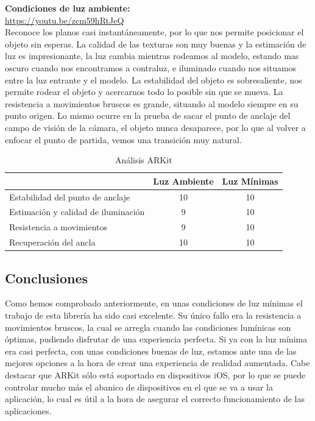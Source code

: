 \textbf{Condiciones de luz ambiente:}\\
\url{https://youtu.be/zcm59hRtJeQ}\\

Reconoce los planos casi instantáneamente, por lo que nos permite posicionar el objeto sin esperas. La calidad de las texturas son muy buenas y la estimación de luz es impresionante, la luz cambia mientras rodeamos al modelo, estando mas oscuro cuando nos encontramos a contraluz, e iluminado cuando nos situamos entre la luz entrante y el modelo. La estabilidad del objeto es sobresaliente, nos permite rodear el objeto y acercarnos todo lo posible sin que se mueva. La resistencia a movimientos bruscos es grande, situando al modelo siempre en su punto origen. Lo mismo ocurre en la prueba de sacar el punto de anclaje del campo de visión de la cámara, el objeto nunca desaparece, por lo que al volver a enfocar el punto de partida, vemos una transición muy natural.


\begin{table}[H]
    \centering
     \begin{tabular}{l c c}
    \toprule
          & Luz Ambiente & Luz Mínimas \\
        \midrule
        Estabilidad del punto de anclaje   &10 &10\\
        
        Estimación y calidad de iluminación  &9 &10 \\
        
        Resistencia a movimientos  &9 &10 \\
        
        Recuperación del ancla  &10 &10 \\
      \bottomrule
    \end{tabular}
    \caption{Análisis ARKit}
    \label{tab:TARKit}
\end{table}

\subsection{Conclusiones}
Como hemos comprobado anteriormente, en unas condiciones de luz mínimas el trabajo de esta librería ha sido casi excelente. Su único fallo era la resistencia a movimientos bruscos, la cual se arregla cuando las condiciones lumínicas son óptimas, pudiendo disfrutar de una experiencia perfecta. Si ya con la luz mínima era casi perfecta, con unas condiciones buenas de luz, estamos ante una de las mejores opciones a la hora de crear una experiencia de realidad aumentada. Cabe destacar que ARKit sólo está soportado en dispositivos iOS, por lo que se puede controlar mucho más el abanico de dispositivos en el que se va a usar la aplicación, lo cual es útil a la hora de asegurar el correcto funcionamiento de las aplicaciones.

